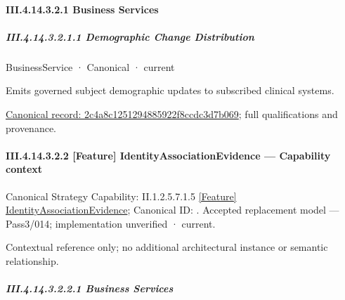 \paragraph*{III.4.14.3.2.1 Business Services}
\label{navigation:III.4.14.3.2.1}

\subparagraph*{III.4.14.3.2.1.1 Demographic Change Distribution}
\label{navigation:III.4.14.3.2.1.1}

\label{element:2c4a8c1251294885922f8ccdc3d7b069}
{\small BusinessService · Canonical · current}\par

Emits governed subject demographic updates to subscribed clinical systems.


{\footnotesize \href{../../../../continuum/business/business-service/2c4a8c1251294885922f8ccdc3d7b069.md}{Canonical record: 2c4a8c1251294885922f8ccdc3d7b069}; full qualifications and provenance.}\par
\paragraph*{III.4.14.3.2.2 [Feature] IdentityAssociationEvidence — Capability context}
\label{navigation:III.4.14.3.2.2}

{\small Canonical Strategy Capability: II.1.2.5.7.1.5 \hyperref[element:4389056525db482a8463e1f79bda5266]{[Feature] IdentityAssociationEvidence}; Canonical ID: \texttt{}. Accepted replacement model — Pass3/014; implementation unverified · current.}\par
Contextual reference only; no additional architectural instance or semantic relationship.\par
\subparagraph*{III.4.14.3.2.2.1 Business Services}
\label{navigation:III.4.14.3.2.2.1}

\label{navigation:III.4.14.3.2.2.1.1}

